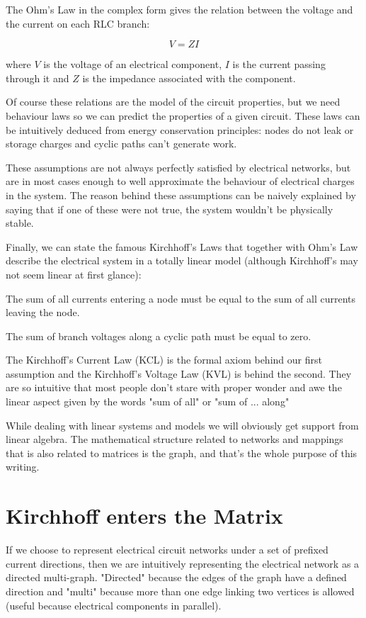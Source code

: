 \documentclass{comjnl}
\begin{document}
The Ohm's Law in the complex form gives the relation between the voltage and the current on each RLC branch:
\begin{axiom}[Ohm]
$$V = ZI $$
\end{axiom}
where $V$ is the voltage of an electrical component, $I$ is the current passing through it and $Z$ is the impedance associated with the component. 

Of course these relations are the model of the circuit properties, but we need behaviour laws so we can predict the properties of a given circuit. These laws can be intuitively deduced from energy conservation principles: nodes do not leak or storage charges and cyclic paths can't generate work.

These assumptions are not always perfectly satisfied by electrical networks, but are in most cases enough to well approximate the behaviour of electrical charges in the system. The reason behind these assumptions can be naively explained by saying that if one of these were not true, the system wouldn't be physically stable.

Finally, we can state the famous Kirchhoff's Laws that together with Ohm's Law describe the electrical system in a totally linear model (although Kirchhoff's may not seem linear at first glance):
\begin{axiom}
The sum of all currents entering a node must be equal to the sum of all currents leaving the node.
\end{axiom}
\begin{axiom}
The sum of branch voltages along a cyclic path must be equal to zero.
\end{axiom}

The Kirchhoff's Current Law (KCL) is the formal axiom behind our first assumption and the Kirchhoff's Voltage Law (KVL) is behind the second. They are so intuitive that most people don't stare with proper wonder and awe the linear aspect given by the words "sum of all" or "sum of ... along"

While dealing with linear systems and models we will obviously get support from linear algebra. The mathematical structure related to networks and mappings that is also related to matrices is the graph, and that's the whole purpose of this writing.

\section{Kirchhoff enters the Matrix}
If we choose to represent electrical circuit networks under a set of prefixed current directions, then we are intuitively representing the electrical network as a directed multi-graph. "Directed" because the edges of the graph have a defined direction and "multi" because more than one edge linking two vertices is allowed (useful because electrical components in parallel).
\end{document}
